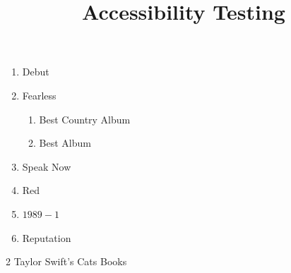 \documentclass{ximera}
\title{Accessibility Testing}
\begin{document}
\begin{abstract}
\end{abstract}
\maketitle
\begin{enumerate}[label=(\alph*)]
\item Debut
\item Fearless
    \begin{enumerate}
    \item Best Country Album
    \item Best Album 
    \end{enumerate}
\item Speak Now

\item Red
\item[1989] \(1989-1\)
\item Reputation
\end{enumerate}



\begin{thebibliography}{2}
 Taylor Swift's Cats
 Books
\end{thebibliography}
\end{document}
